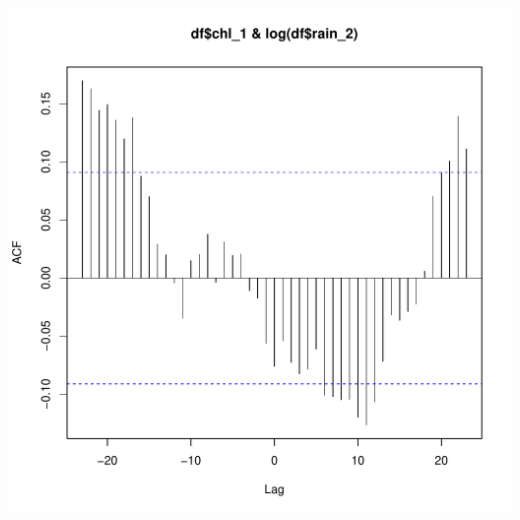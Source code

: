 \documentclass{article}\usepackage[]{graphicx}\usepackage[]{color}
\makeatletter
\def\maxwidth{ %
  \ifdim\Gin@nat@width>\linewidth
    \linewidth
  \else
    \Gin@nat@width
  \fi
}
\newenvironment{knitrout}{}{} %
\makeatother
\begin{document}
\begin{knitrout}
\includegraphics[width=\maxwidth]{figure/unnamed-chunk-24-2} 

\end{knitrout}
\end{document}
